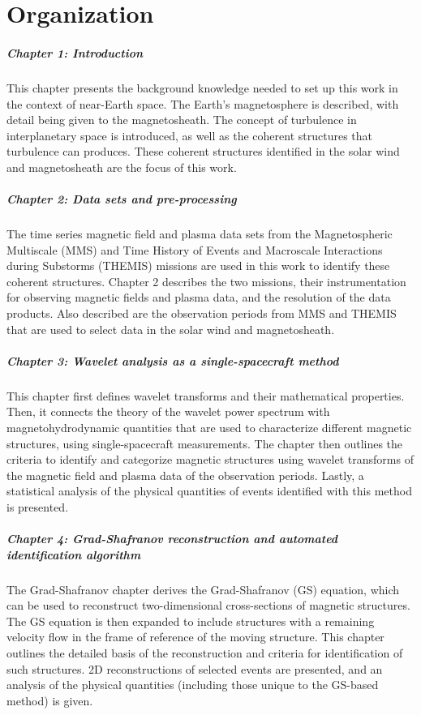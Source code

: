 \chapter*{Organization}

\paragraph*{Chapter 1: Introduction}
This chapter presents the background knowledge needed to set up this work in the context of near-Earth space. The Earth's magnetosphere is described, with detail being given to the magnetosheath. The concept of turbulence in interplanetary space is introduced, as well as the coherent structures that turbulence can produces. These coherent structures identified in the solar wind and magnetosheath are the focus of this work.

\paragraph*{Chapter 2: Data sets and pre-processing}
The time series magnetic field and plasma data sets from the Magnetospheric Multiscale (MMS) and Time History of Events and Macroscale Interactions during Substorms (THEMIS) missions are used in this work to identify these coherent structures. Chapter 2 describes the two missions, their instrumentation for observing magnetic fields and plasma data, and the resolution of the data products. Also described are the observation periods from MMS and THEMIS that are used to select data in the solar wind and magnetosheath.

\paragraph*{Chapter 3: Wavelet analysis as a single-spacecraft method}
This chapter first defines wavelet transforms and their mathematical properties. Then, it connects the theory of the wavelet power spectrum with magnetohydrodynamic quantities that are used to characterize different magnetic structures, using single-spacecraft measurements. The chapter then outlines the criteria to identify and categorize magnetic structures using wavelet transforms of the magnetic field and plasma data of the observation periods. Lastly, a statistical analysis of the physical quantities of events identified with this method is presented.

\paragraph*{Chapter 4: Grad-Shafranov reconstruction and automated identification algorithm}
The Grad-Shafranov chapter derives the Grad-Shafranov (GS) equation, which can be used to reconstruct two-dimensional cross-sections of magnetic structures. The GS equation is then expanded to include structures with a remaining velocity flow in the frame of reference of the moving structure. This chapter outlines the detailed basis of the reconstruction and criteria for identification of such structures. 2D reconstructions of selected events are presented, and an analysis of the physical quantities (including those unique to the GS-based method) is given.

